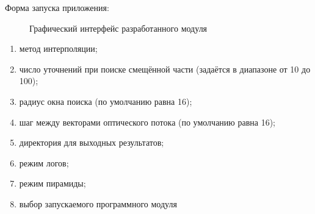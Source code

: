 Форма запуска приложения:
\begin{figure}[h!]
\caption{Графический интерфейс разработанного модуля}
\label{pic:qml_screen}
\end{figure}
\begin{enumerate}
\item метод интерполяции;
\item число уточнений при поиске смещённой части (задаётся в диапазоне от 10 до 100);
\item радиус окна поиска (по умолчанию равна 16);
\item шаг между векторами оптического потока (по умолчанию равна 16);
\item директория для выходных результатов;
\item режим логов;
\item режим пирамиды;
\item выбор запускаемого программного модуля
\end{enumerate}